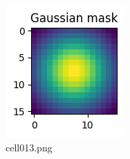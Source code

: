 \begin{figure}[ht]
	\centering
	\includegraphics[scale=0.8, max width=\linewidth]{./fig/energy-based-model/predictive-coding/cell013.png}
	\caption{cell013.png}
	\label{cell013.png}
\end{figure}